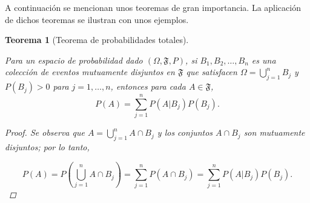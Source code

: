 \documentclass[
  us-letterpaper,
]{scrreprt}
\theoremstyle{plain}
\newtheorem{theorem}{Teorema}[chapter]
\theoremstyle{definition}
\theoremstyle{definition}
\theoremstyle{plain}
\theoremstyle{remark}
\begin{document}
A continuación se mencionan unos teoremas de gran importancia. La
aplicación de dichos teoremas se ilustran con unos ejemplos.

\begin{theorem}[Teorema de probabilidades
totales]\protect\hypertarget{thm-ptotales}{}\label{thm-ptotales}

Para un espacio de probabilidad dado \((\Omega, \mathfrak{F}, P)\), si
\(B_1, B_2, \ldots, B_n\) es una colección de eventos mutuamente
disjuntos en \(\mathfrak{F}\) que satisfacen
\(\Omega = \bigcup\limits_{j=1}^n B_j\) y \(P(B_j)>0\) para
\(j=1,\ldots, n\), entonces para cada \(A\in \mathfrak{F}\),
\[P(A)=\sum_{j=1}^n P(A|B_j)P(B_j).\]

\begin{proof}
Se observa que \(A=\bigcup\limits_{j=1}^n A\cap B_j\) y los conjuntos
\(A\cap B_j\) son mutuamente disjuntos; por lo tanto,

\[P(A)=P\left(\bigcup_{j=1}^n A\cap B_j\right)=\sum_{j=1}^n P(A\cap B_j)= \sum_{j=1}^n P(A|B_j)P(B_j).\]
\end{proof}

\end{theorem}
\end{document}
